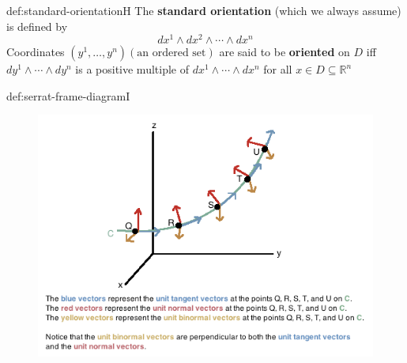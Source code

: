 \documentclass[landscape, 8pt]{extarticle}
\begin{document}
\begin{multicols}{3}
\begin{dfn}{def:standard-orientation}{H}
The \textbf{standard orientation} (which we always assume) is defined by
\[dx^{1} \wedge dx^{2}\wedge \cdots \wedge dx^{n}\]
Coordinates \((y^{1},\dots,y^{n})(\text{an ordered set})\) are said to be \textbf{oriented} on \(D\) iff \(dy^{1}\wedge \cdots \wedge dy^{n}\) is a positive multiple of \(dx^{1}\wedge \cdots \wedge dx^{n}\) for all \(x\in D \subseteq \mathbb{R}^{n}\)
\end{dfn}

\begin{dfn}{def:serrat-frame-diagram}{I}
\begin{figure}[H]
    \centering
    \includegraphics[width=\linewidth]{images/normal tangent.png}
\end{figure}
\end{dfn}


\end{multicols}
\end{document}
